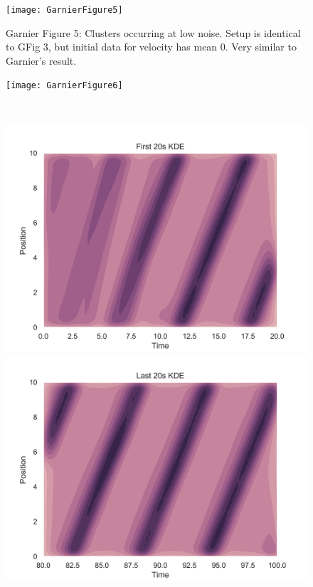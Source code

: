 \documentclass[11pt,a4paper, final, dvipsnames]{article}
\begin{document}
\begin{figure}
    \centering
    \texttt{[image: GarnierFigure5]}
    \caption{Garnier Figure 5: Clusters occurring at low noise. Setup is identical to GFig 3, but initial data for velocity has mean 0. Very similar to Garnier's result.}
    \end{figure}
    
    \begin{figure}
    \centering
    \begin{minipage}[b]{\textwidth}
        \centering
        
        \texttt{[image: GarnierFigure6]}
    \end{minipage} \\
    
    \begin{minipage}[b]{0.49\textwidth}
        \centering
        \includegraphics[width=\textwidth]{GarnierFigure6b}
    \end{minipage} %
    \begin{minipage}[b]{0.49\textwidth}
        \centering                    
        \includegraphics[width=\textwidth]{GarnierFigure6d}

\end{minipage}
\end{figure}
\end{document}
